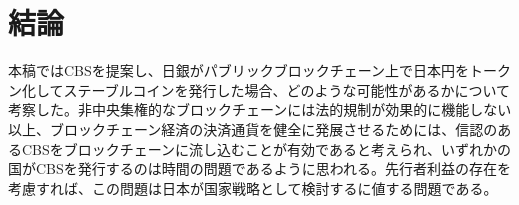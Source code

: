\documentclass[dvipdfmx,a4paper]{jsarticle}
\begin{document}
\section{結論}

本稿ではCBSを提案し、日銀がパブリックブロックチェーン上で日本円をトークン化してステーブルコインを発行した場合、どのような可能性があるかについて考察した。非中央集権的なブロックチェーンには法的規制が効果的に機能しない以上、ブロックチェーン経済の決済通貨を健全に発展させるためには、信認のあるCBSをブロックチェーンに流し込むことが有効であると考えられ、いずれかの国がCBSを発行するのは時間の問題であるように思われる。先行者利益の存在を考慮すれば、この問題は日本が国家戦略として検討するに値する問題である。



\end{document}
